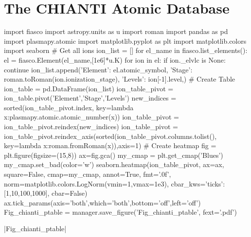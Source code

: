 \documentclass[12pt,aspectratio=169]{beamer}
\begin{document}
\section{The CHIANTI Atomic Database}
\begin{frame}[fragile]
    \begin{pycode}[manager]
import fiasco
import astropy.units as u
import roman
import pandas as pd
import plasmapy.atomic
import matplotlib.pyplot as plt
import matplotlib.colors
import seaborn
# Get all ions
ion_list = []
for el_name in fiasco.list_elements():
    el = fiasco.Element(el_name,[1e6]*u.K)
    for ion in el:
        if ion._elvlc is None:
            continue
        ion_list.append({'Element': el.atomic_symbol,
                         'Stage': roman.toRoman(ion.ionization_stage),
                         'Levels': ion[-1].level,})
# Create Table
ion_table = pd.DataFrame(ion_list)
ion_table_pivot = ion_table.pivot('Element','Stage','Levels')
new_indices = sorted(ion_table_pivot.index, key=lambda x:plasmapy.atomic.atomic_number(x))
ion_table_pivot = ion_table_pivot.reindex(new_indices)
ion_table_pivot = ion_table_pivot.reindex_axis(sorted(ion_table_pivot.columns.tolist(),
                                                      key=lambda x:roman.fromRoman(x)),axis=1)
# Create heatmap
fig = plt.figure(figsize=(15,8))
ax=fig.gca()
my_cmap = plt.get_cmap('Blues')
my_cmap.set_bad(color='w')
seaborn.heatmap(ion_table_pivot,
                ax=ax,
                square=False,
                cmap=my_cmap,
                annot=True,
                fmt='.0f',
                norm=matplotlib.colors.LogNorm(vmin=1,vmax=1e3),
                cbar_kws={'ticks':[1,10,100,1000]},
                cbar=False)
ax.tick_params(axis='both',which='both',bottom='off',left='off')
Fig_chianti_ptable = manager.save_figure('Fig_chianti_ptable', fext='.pdf')
    \end{pycode}
    \py[manager]|Fig_chianti_ptable|
\end{frame}
\end{document}
